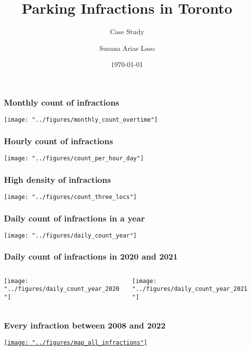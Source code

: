 \documentclass[fleqn]{beamer}
\title[]{Parking Infractions in Toronto}
\subtitle[]{Case Study}
\author[]{Susana Arias Laso}
\date{\today}
\begin{document}
\begin{frame}
  \titlepage

 
\end{frame}

\begin{frame}
  \frametitle{Monthly count of infractions}
  \centering
  \texttt{[image: "../figures/monthly\_count\_overtime"]}
\end{frame}

\begin{frame}
  \frametitle{Hourly count of infractions}
  \centering
  \texttt{[image: "../figures/count\_per\_hour\_day"]}
\end{frame}

\begin{frame}
  \frametitle{High density of infractions}
  \centering
  \texttt{[image: "../figures/count\_three\_locs"]}
\end{frame}


\begin{frame}
\frametitle{Daily count of infractions in a year}
  \centering
  \texttt{[image: "../figures/daily\_count\_year"]}
\end{frame}

\begin{frame}
  \frametitle{Daily count of infractions in 2020 and 2021}
  \begin{columns}[t]
    \begin{column}{6.5cm}
      \centering
      \texttt{[image: "../figures/daily\_count\_year\_2020"]}
    \end{column}
    \begin{column}{6.5cm}
      \centering
      \texttt{[image: "../figures/daily\_count\_year\_2021"]}
    \end{column}
  \end{columns}
\end{frame}



\begin{frame}
  \frametitle{Every infraction between 2008 and 2022}
  \centering
  \href{https://sariaslaso.github.io/parking_toronto/figures/all_infractions.html}{\texttt{[image: "../figures/map\_all\_infractions"]}}
\end{frame}
\end{document}
